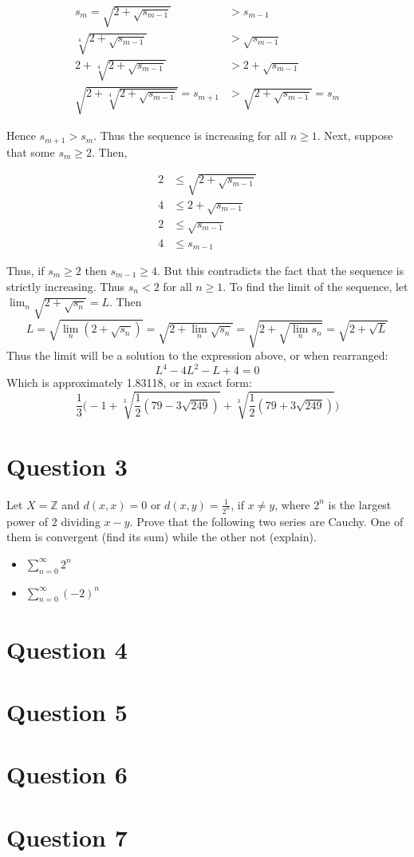 \documentclass[12pt, letterpaper]{article}
\begin{document}
\begin{align*}
  s_m = \sqrt{2 + \sqrt{s_{m-1}}} &> s_{m-1}\\
  \sqrt[4]{2 + \sqrt{s_{m-1}}} &> \sqrt{s_{m-1}}\\
  2 + \sqrt[4]{2 + \sqrt{s_{m-1}}} &> 2 + \sqrt{s_{m-1}} \\
  \sqrt{2 + \sqrt[4]{2 + \sqrt{s_{m-1}}}} = s_{m + 1} &> \sqrt{2 + \sqrt{s_{m-1}}} = s_m
\end{align*}

Hence $s_{m + 1} > s_m$. Thus the sequence is increasing for all $n \geq 1$. Next, suppose that some $s_m \geq 2$. Then,

\begin{align*}
  2 &\leq \sqrt{2 + \sqrt{s_{m - 1}}}\\
  4 &\leq 2 + \sqrt{s_{m - 1}}\\
  2 &\leq \sqrt{s_{m - 1}} \\
  4 &\leq s_{m - 1}
\end{align*}

Thus, if $s_m \geq 2$ then $s_{m - 1} \geq 4$. But this contradicts the fact that the sequence is strictly increasing. Thus $s_n <2$ for all $n \geq 1$.
To find the limit of the sequence, let $\lim_n \sqrt{2+\sqrt{s_n}} = L$. Then
$$ L = \sqrt{\lim_n (2 + \sqrt{s_n})} = \sqrt{2 + \lim_n \sqrt{s_n}} = \sqrt{2 + \sqrt{\lim_n s_n}} = \sqrt{2 + \sqrt{L}} $$
Thus the limit will be a solution to the expression above, or when rearranged:
$$ L^4 - 4L^2 - L + 4 = 0 $$
Which is approximately 1.83118, or in exact form:
$$\frac{1}{3}\Big( -1 + \sqrt[3]{\frac{1}{2}(79 - 3\sqrt{249})} + \sqrt[3]{\frac{1}{2}(79 + 3\sqrt{249})} \Big)$$
\pagebreak

\section*{Question 3}
Let $X=\mathbb Z$ and $d(x,x)=0$ or $d(x,y)=\frac{1}{2^n}$, if $x\neq y$, where $2^n$ is the largest power of $2$ dividing $x-y$.
Prove that the following two series are Cauchy. One of them is convergent (find its sum) while the other not (explain).
\begin{itemize}
\item $\sum_{n=0}^{\infty} 2^n$
\item $\sum_{n=0}^{\infty} (-2)^n$
\end{itemize}

\section*{Question 4}
\section*{Question 5}
\section*{Question 6}
\section*{Question 7}
\end{document}
